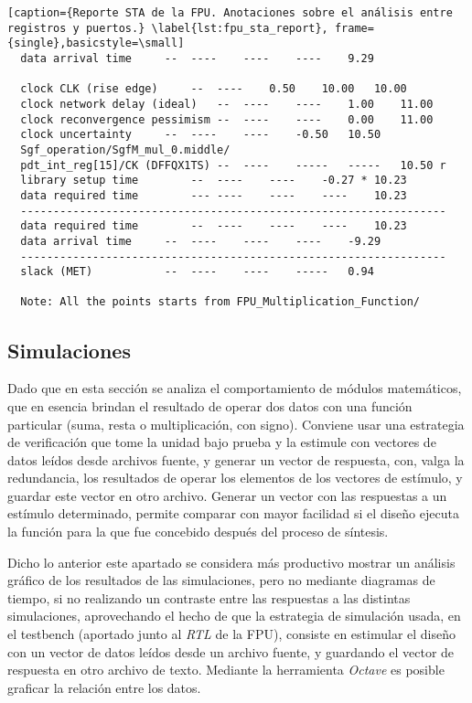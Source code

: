 \begin{lstlisting}[caption={Reporte STA de la FPU. Anotaciones sobre el análisis entre registros y puertos.} \label{lst:fpu_sta_report}, frame={single},basicstyle=\small]
  data arrival time		--	----	----	----	9.29

  clock CLK (rise edge)		--	----	0.50	10.00	10.00
  clock network delay (ideal)	--	----	----	1.00	11.00
  clock reconvergence pessimism	--	----	----	0.00	11.00
  clock uncertainty		--	----	----	-0.50	10.50
  Sgf_operation/SgfM_mul_0.middle/
  pdt_int_reg[15]/CK (DFFQX1TS)	--	----	-----	-----	10.50 r
  library setup time		--	----	----	-0.27 *	10.23
  data required time		---	----	----	----	10.23
  -----------------------------------------------------------------
  data required time		--	----	----	----	10.23
  data arrival time		--	----	----	----	-9.29
  -----------------------------------------------------------------
  slack (MET)			--	----	----	-----	0.94
  
  Note: All the points starts from FPU_Multiplication_Function/

\end{lstlisting}

\newpage

\subsection{Simulaciones}
\label{s_sec:fpu_sim}
Dado que en esta sección se analiza el comportamiento de módulos matemáticos, que en esencia brindan el resultado de operar dos datos con una función particular (suma, resta o multiplicación, con signo). Conviene usar una estrategia de verificación que tome la unidad bajo prueba y la estimule con vectores de datos leídos desde archivos fuente, y generar un vector de respuesta, con, valga la redundancia, los resultados de operar los elementos de los vectores de estímulo, y guardar este vector en otro archivo. Generar un vector con las respuestas a un estímulo determinado, permite comparar con mayor facilidad si el diseño ejecuta la función para la que fue concebido después del proceso de síntesis.

Dicho lo anterior este apartado se considera más productivo mostrar un análisis gráfico de los resultados de las simulaciones, pero no mediante diagramas de tiempo, si no realizando un contraste entre las respuestas a las distintas simulaciones, aprovechando el hecho de que la estrategia de simulación usada, en el testbench (aportado junto al \textit{RTL} de la FPU), consiste en estimular el diseño con un vector de datos leídos desde un archivo fuente, y guardando el vector de respuesta en otro archivo de texto. Mediante la herramienta \textit{Octave} es posible graficar la relación entre los datos.

